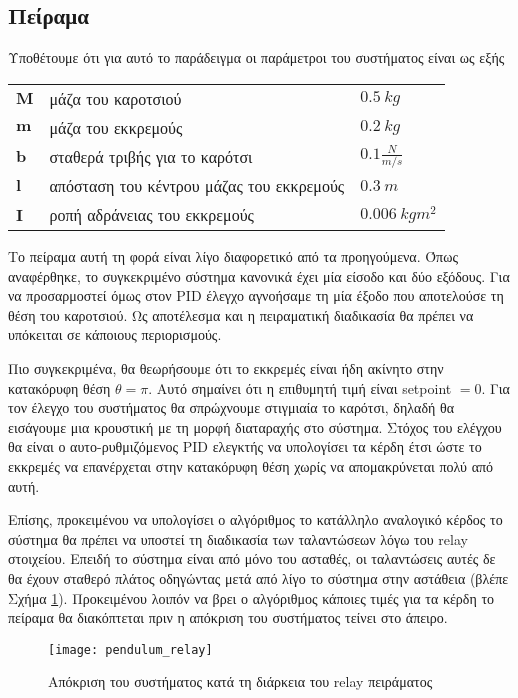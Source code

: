 \subsection{Πείραμα}

Υποθέτουμε ότι για αυτό το παράδειγμα οι παράμετροι του συστήματος είναι ως εξής
\begin{flushleft}
\begin{tabular}{lll}
$\mathbf{M}$ & μάζα του καροτσιού & $0.5\ kg$ \\  
$\mathbf{m}$ & μάζα του εκκρεμούς & $0.2\ kg$ \\ 
$\mathbf{b}$ & σταθερά τριβής για το καρότσι & $0.1 \frac{N}{m/s}$ \\ 
$\mathbf{l}$ & απόσταση του κέντρου μάζας του εκκρεμούς & $0.3\ m$ \\ 
$\mathbf{I}$ & ροπή αδράνειας του εκκρεμούς & $0.006\ kgm^2$ \\ 
\end{tabular}
\end{flushleft}
 
Το πείραμα αυτή τη φορά είναι λίγο διαφορετικό από τα προηγούμενα. Όπως αναφέρθηκε, το συγκεκριμένο σύστημα κανονικά έχει μία είσοδο και δύο εξόδους. Για να προσαρμοστεί όμως στον PID έλεγχο αγνοήσαμε τη μία έξοδο που αποτελούσε τη θέση του καροτσιού. Ως αποτέλεσμα και η πειραματική διαδικασία θα πρέπει να υπόκειται σε κάποιους περιορισμούς.

Πιο συγκεκριμένα, θα θεωρήσουμε ότι το εκκρεμές είναι ήδη ακίνητο στην κατακόρυφη θέση $\theta = \pi$. Αυτό σημαίνει ότι η επιθυμητή τιμή είναι setpoint $=0$. Για τον έλεγχο του συστήματος θα σπρώχνουμε στιγμιαία το καρότσι, δηλαδή θα εισάγουμε μια κρουστική με τη μορφή διαταραχής στο σύστημα. Στόχος του ελέγχου θα είναι ο αυτο-ρυθμιζόμενος PID ελεγκτής να υπολογίσει τα κέρδη έτσι ώστε το εκκρεμές να επανέρχεται στην κατακόρυφη θέση χωρίς να απομακρύνεται πολύ από αυτή. 

Επίσης, προκειμένου να υπολογίσει ο αλγόριθμος το κατάλληλο αναλογικό κέρδος το σύστημα θα πρέπει να υποστεί τη διαδικασία των ταλαντώσεων λόγω του relay στοιχείου. Επειδή το σύστημα είναι από μόνο του ασταθές, οι ταλαντώσεις αυτές δε θα έχουν σταθερό πλάτος οδηγώντας μετά από λίγο το σύστημα στην αστάθεια (βλέπε Σχήμα \ref{fig:pendulum_relay}). Προκειμένου λοιπόν να βρει ο αλγόριθμος κάποιες τιμές για τα κέρδη το πείραμα θα διακόπτεται πριν η απόκριση του συστήματος τείνει στο άπειρο. 

\begin{figure}[h]
  \centering
  \texttt{[image: pendulum\_relay]}
  \caption{Απόκριση του συστήματος κατά τη διάρκεια του relay πειράματος}
  \label{fig:pendulum_relay}
\end{figure}

